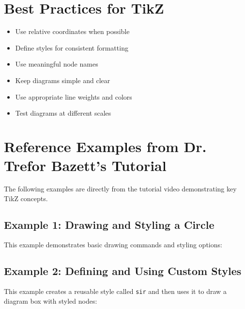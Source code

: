 \documentclass{article}
\begin{document}
\section{Best Practices for TikZ}
\begin{itemize}
    \item Use relative coordinates when possible
    \item Define styles for consistent formatting
    \item Use meaningful node names
    \item Keep diagrams simple and clear
    \item Use appropriate line weights and colors
    \item Test diagrams at different scales
\end{itemize}

\section{Reference Examples from Dr. Trefor Bazett's Tutorial}
The following examples are directly from the tutorial video demonstrating key TikZ concepts.

\subsection{Example 1: Drawing and Styling a Circle}
This example demonstrates basic drawing commands and styling options:

\begin{center}
\end{center}

\subsection{Example 2: Defining and Using Custom Styles}
This example creates a reusable style called \texttt{sir} and then uses it to draw a diagram box with styled nodes:
\end{document}
